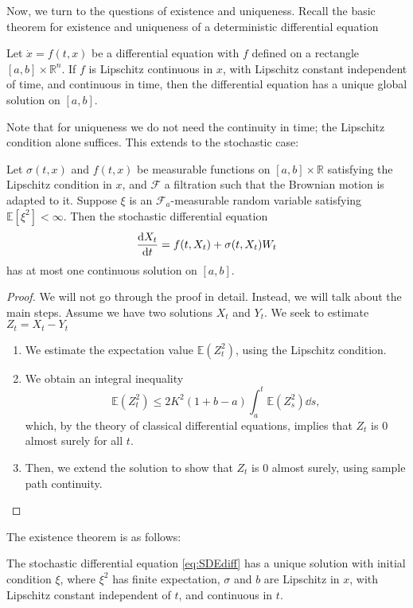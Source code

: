 \documentclass[prb,12pt]{revtex4-2}
\theoremstyle{definition}
\theoremstyle{definition}
\theoremstyle{definition}
\newcommand{\R}{\mathbb{R}}
\begin{document}
Now, we turn to the questions of existence and uniqueness. Recall the basic theorem for existence and uniqueness of a deterministic differential equation
\begin{Theorem}
	Let $\dot{x} = f(t,x)$ be a differential equation with $f$ defined on a rectangle $[a,b]\times \R^n$. If $f$ is Lipschitz continuous in $x$, with Lipschitz constant independent of time, and continuous in time, then the differential equation has a unique global solution on $[a,b]$.
\end{Theorem}
Note that for uniqueness we do not need the continuity in time; the Lipschitz condition alone suffices. This extends to the stochastic case:
\begin{Theorem}
	Let $\sigma(t,x)$ and $f(t,x)$ be measurable functions on $[a,b]\times \R$ satisfying the Lipschitz condition in $x$, and $\mathcal{F}$ a filtration such that the Brownian motion is adapted to it. Suppose $\xi$ is an $\mathcal{F}_a$-measurable random variable satisfying $\mathbb{E}[\xi^2]<\infty$. Then the stochastic differential equation
	\[\dv{X_t}{t}=f(t, X_t)+\sigma(t, X_t)W_t\]
	has at most one continuous solution on $[a,b]$.
\end{Theorem}
\begin{proof}
	We will not go through the proof in detail. Instead, we will talk about the main steps. Assume we have two solutions $X_t$ and $Y_t$. We seek to estimate $Z_t=X_t-Y_t$
	\begin{enumerate}
		\item We estimate the expectation value $\mathbb{E}(Z_t^2)$, using the Lipschitz condition.
		\item We obtain an integral inequality
			 \[
			 \mathbb{E}(Z_t^2) \le 2K^2 (1+b-a)\int_a^t \mathbb{E}(Z_s^2)\dd{s}
			,\]
			which, by the theory of classical differential equations, implies that $Z_t$ is 0 almost surely for all $t$.
		\item Then, we extend the solution to show that $Z_t$ is $0$ almost surely, using sample path continuity.\qedhere
	\end{enumerate}
\end{proof}
The existence theorem is as follows:
\begin{Theorem}
	The stochastic differential equation \eqref{eq:SDEdiff} has a unique solution with initial condition $\xi$, where $\xi^2$ has finite expectation, $\sigma$ and $b$ are Lipschitz in $x$, with Lipschitz constant independent of $t$, and continuous in $t$.
\end{Theorem}
\end{document}
